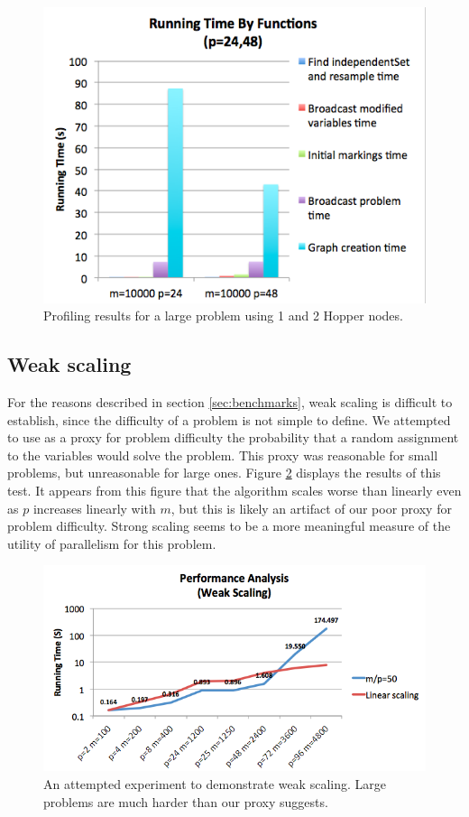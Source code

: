 \documentclass[twocolumn]{article}
\begin{document}
\begin{figure}[ht]
  \includegraphics[scale=0.4]{figures/profiling-strong.png}
  \caption{Profiling results for a large problem using 1 and 2 Hopper nodes.}
  \label{fig:profiling-strong}
\end{figure}

\subsection{Weak scaling}
For the reasons described in section \ref{sec:benchmarks}, weak scaling is difficult to establish, since the difficulty of a problem is not simple to define.  We attempted to use as a proxy for problem difficulty the probability that a random assignment to the variables would solve the problem.  This proxy was reasonable for small problems, but unreasonable for large ones.  Figure \ref{fig:weak} displays the results of this test.  It appears from this figure that the algorithm scales worse than linearly even as $p$ increases linearly with $m$, but this is likely an artifact of our poor proxy for problem difficulty.  Strong scaling seems to be a more meaningful measure of the utility of parallelism for this problem.

\begin{figure}[ht]
  \includegraphics[scale=0.4]{figures/weak.png}
  \caption{An attempted experiment to demonstrate weak scaling.  Large problems are much harder than our proxy suggests.}
  \label{fig:weak}
\end{figure}
\end{document}
